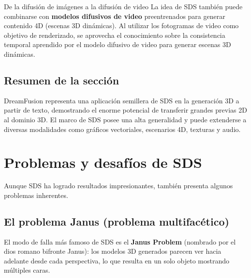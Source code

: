 \documentclass[a4paper]{article}
\begin{document}
\begin{knowledgebox}{De la difusión de imágenes a la difusión de video}
La idea de SDS también puede combinarse con \textbf{modelos difusivos de video} preentrenados para generar contenido 4D (escenas 3D dinámicas). Al utilizar los fotogramas de video como objetivo de renderizado, se aprovecha el conocimiento sobre la consistencia temporal aprendido por el modelo difusivo de video para generar escenas 3D dinámicas.
\end{knowledgebox}

\subsection{Resumen de la sección}

DreamFusion representa una aplicación semillera de SDS en la generación 3D a partir de texto, demostrando el enorme potencial de transferir grandes previas 2D al dominio 3D. El marco de SDS posee una alta generalidad y puede extenderse a diversas modalidades como gráficos vectoriales, escenarios 4D, texturas y audio.

\newpage
\section{Problemas y desafíos de SDS}

Aunque SDS ha logrado resultados impresionantes, también presenta algunos problemas inherentes.

\subsection{El problema Janus (problema multifacético)}

El modo de falla más famoso de SDS es el \textbf{Janus Problem} (nombrado por el dios romano bifronte Janus): los modelos 3D generados parecen ver hacia adelante desde cada perspectiva, lo que resulta en un solo objeto mostrando múltiples caras.
\end{document}
